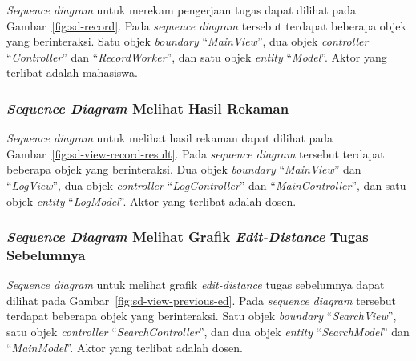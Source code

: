 \emph{Sequence diagram} untuk merekam pengerjaan tugas dapat
dilihat pada Gambar~\ref{fig:sd-record}. Pada \emph{sequence diagram}
tersebut terdapat beberapa objek yang berinteraksi. Satu objek
\emph{boundary} ``\emph{MainView}'', dua objek \emph{controller}
``\emph{Controller}'' dan ``\emph{RecordWorker}'', dan satu objek
\emph{entity} ``\emph{Model}''. Aktor yang terlibat adalah mahasiswa.

\subsubsection{\emph{Sequence Diagram} Melihat Hasil Rekaman}

\emph{Sequence diagram} untuk melihat hasil rekaman dapat
dilihat pada Gambar~\ref{fig:sd-view-record-result}. Pada \emph{sequence diagram}
tersebut terdapat beberapa objek yang berinteraksi. Dua objek
\emph{boundary} ``\emph{MainView}'' dan ``\emph{LogView}'', dua objek \emph{controller}
``\emph{LogController}'' dan ``\emph{MainController}'', dan satu objek
\emph{entity} ``\emph{LogModel}''. Aktor yang terlibat adalah dosen.

\subsubsection{\emph{Sequence Diagram} Melihat Grafik \emph{Edit-Distance} Tugas Sebelumnya}

\emph{Sequence diagram} untuk melihat grafik \emph{edit-distance} tugas
sebelumnya dapat dilihat pada Gambar~\ref{fig:sd-view-previous-ed}.
Pada \emph{sequence diagram} tersebut terdapat beberapa objek yang
berinteraksi. Satu objek \emph{boundary} ``\emph{SearchView}'', satu objek
\emph{controller} ``\emph{SearchController}'', dan dua objek \emph{entity}
``\emph{SearchModel}'' dan ``\emph{MainModel}''. Aktor yang terlibat adalah dosen.


